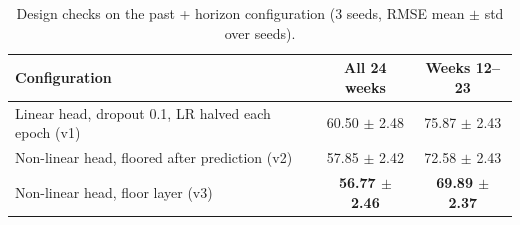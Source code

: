 \documentclass[11pt,a4paper]{article}
\begin{document}
\begin{table}[H]\centering\small
\caption{The three leaderboard submissions. Validation = RMSE over the 24 evaluation weeks (all / weeks 12--23) of exactly the configuration submitted.}
\label{tab:t2subs}
\end{table}

\begin{table}[H]\centering\small
\caption{Design checks on the past + horizon configuration (3 seeds, RMSE mean $\pm$ std over seeds).}
\label{tab:t2design}
\begin{tabular}{lcc}
\toprule
Configuration & All 24 weeks & Weeks 12--23\\
\midrule
Linear head, dropout 0.1, LR halved each epoch (v1) & 60.50 $\pm$ 2.48 & 75.87 $\pm$ 2.43\\
Non-linear head, floored after prediction (v2) & 57.85 $\pm$ 2.42 & 72.58 $\pm$ 2.43\\
Non-linear head, floor layer (v3) & \textbf{56.77 $\pm$ 2.46} & \textbf{69.89 $\pm$ 2.37}\\
\bottomrule
\end{tabular}
\end{table}
\end{document}
